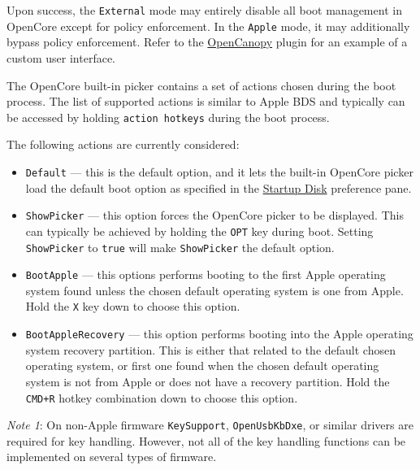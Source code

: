 \documentclass[]{article}
\providecommand{\tightlist}{%
  \setlength{\itemsep}{0pt}\setlength{\parskip}{0pt}}
\begin{document}
\begin{enumerate}
  Upon success, the \texttt{External} mode may entirely disable all boot management
  in OpenCore except for policy enforcement. In the \texttt{Apple} mode, it may
  additionally bypass policy enforcement. Refer to the \hyperref[ueficanopy]{OpenCanopy}
  plugin for an example of a custom user interface.

  The OpenCore built-in picker contains a set of actions chosen during the boot process.
  The list of supported actions is similar to Apple BDS and typically can be accessed by
  holding \texttt{action hotkeys} during the boot process.

  The following actions are currently considered:

  \begin{itemize}
  \tightlist
  \item \texttt{Default} --- this is the default option, and it lets the built-in OpenCore
  picker load the default boot option as specified in the
  \href{https://support.apple.com/HT202796}{Startup Disk} preference pane.
  \item \texttt{ShowPicker} --- this option forces the OpenCore picker to be displayed. This can
  typically be achieved by holding the \texttt{OPT} key during boot. Setting \texttt{ShowPicker} to
  \texttt{true} will make \texttt{ShowPicker} the default option.
  \item \texttt{BootApple} --- this options performs booting to the first Apple
  operating system found unless the chosen default operating system is one from Apple.
  Hold the \texttt{X} key down to choose this option.
  \item \texttt{BootAppleRecovery} --- this option performs booting into the Apple operating
  system recovery partition. This is either that related to the default chosen operating system,
  or first one found when the chosen default operating system is not from Apple or does not have
  a recovery partition. Hold the \texttt{CMD+R} hotkey combination down to choose this option.
  \end{itemize}

  \emph{Note 1}: On non-Apple firmware \texttt{KeySupport}, \texttt{OpenUsbKbDxe}, or similar drivers are
  required for key handling. However, not all of the key handling functions can be implemented on several
  types of firmware.


\end{enumerate}
\end{document}
